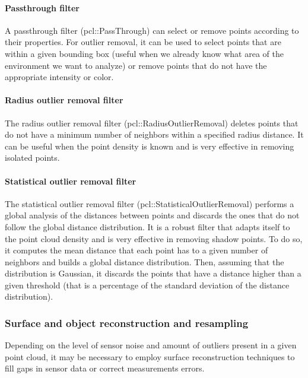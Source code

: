 \paragraph{Passthrough filter}

A passthrough filter (pcl::PassThrough) can select or remove points according to their properties. For outlier removal, it can be used to select points that are within a given bounding box (useful when we already know what area of the environment we want to analyze) or remove points that do not have the appropriate intensity or color.


\paragraph{Radius outlier removal filter}

The radius outlier removal filter (pcl::RadiusOutlierRemoval) deletes points that do not have a minimum number of neighbors within a specified radius distance. It can be useful when the point density is known and is very effective in removing isolated points.


\paragraph{Statistical outlier removal filter}

The statistical outlier removal filter (pcl::StatisticalOutlierRemoval) \cite{Rusu2010a} performs a global analysis of the distances between points and discards the ones that do not follow the global distance distribution. It is a robust filter that adapts itself to the point cloud density and is very effective in removing shadow points. To do so, it computes the mean distance that each point has to a given number of neighbors and builds a global distance distribution. Then, assuming that the distribution is Gaussian, it discards the points that have a distance higher than a given threshold (that is a percentage of the standard deviation of the distance distribution).


\subsubsection{Surface and object reconstruction and resampling}\label{subsec:localization_system_surface-reconstruction-resampling}

Depending on the level of sensor noise and amount of outliers present in a given point cloud, it may be necessary to employ surface reconstruction techniques to fill gaps in sensor data or correct measurements errors.

